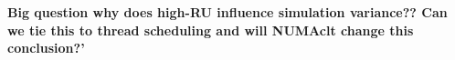 \documentclass[letterpaper, 10 pt, journal, twoside]{IEEEtran}
\begin{document}


\textbf{Big question why does high-RU influence simulation variance?? Can we tie this to thread scheduling and will NUMAclt change this conclusion?'}


\end{document}

